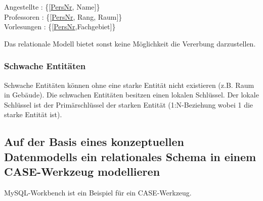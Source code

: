 \begin{center}
Angestellte : \{[\underline{PersNr}, Name]\} \\
Professoren : \{[\underline{PersNr}, Rang, Raum]\} \\
Vorlesungen : \{[\underline{PersNr},Fachgebiet]\}
\end{center}

Das relationale Modell bietet sonst keine Möglichkeit die Vererbung darzustellen.

\subsubsection{Schwache Entitäten}

Schwache Entitäten können ohne eine starke Entität nicht existieren (z.B. Raum in Gebäude). Die schwachen Entitäten besitzen einen lokalen Schlüssel. Der lokale Schlüssel ist der Primärschlüssel der starken Entität (1:N-Beziehung wobei 1 die starke Entität ist). 

\subsection{Auf der Basis eines konzeptuellen Datenmodells ein relationales Schema in einem CASE-Werkzeug modellieren}

MySQL-Workbench ist ein Beispiel für ein \ac{CASE}-Werkzeug.
